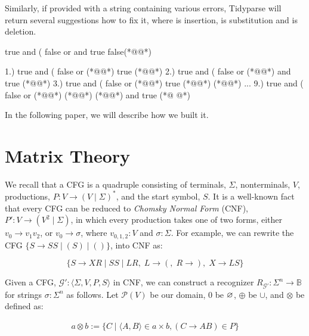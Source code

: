 \documentclass[sigplan,review,anonymous,acmsmall]{acmart}\settopmatter{printfolios=false,printccs=false,printacmref=false}
\begin{document}
    \noindent Similarly, if provided with a string containing various errors, Tidyparse will return several suggestions how to fix it, where  is insertion,  is substitution and  is deletion.

\begin{tidyinput}
true and ( false or and true false(*@\caret{ }@*)
\end{tidyinput}

\begin{tidyoutput}
1.) true and ( false or (*@\hlorange{!}@*) true (*@\hlorange{)}@*)
2.) true and ( false or (*@@*) and true (*@\hlorange{)}@*)
3.) true and ( false or (*@\hlorange{(}@*) true (*@\hlorange{)}@*) (*@\hlgreen{)}@*)
...
9.) true and ( false or (*@\hlgreen{!}@*) (*@@*) (*@\hlgreen{)}@*) and true (*@ @*)
\end{tidyoutput}

    \noindent In the following paper, we will describe how we built it.

    \section{Matrix Theory}

    We recall that a CFG is a quadruple consisting of terminals, $\Sigma$, nonterminals, $V$, productions, $P: V \rightarrow (V \mid \Sigma)^*$, and the start symbol, $S$. It is a well-known fact that every CFG can be reduced to \textit{Chomsky Normal Form} (CNF), $P': V \rightarrow (V^2 \mid \Sigma)$, in which every production takes one of two forms, either $v_0 \rightarrow v_1 v_2$, or $v_0 \rightarrow \sigma$, where $v_{0, 1, 2}: V$ and $\sigma: \Sigma$. For example, we can rewrite the CFG $\{S \rightarrow S S \mid ( S ) \mid ()\}$, into CNF as:

    \[
        \{S\rightarrow XR \mid SS \mid LR,\; L \rightarrow (,\; R \rightarrow ),\; X\rightarrow LS\}
    \]

    \noindent Given a CFG, $\mathcal{G}' : \langle \Sigma, V, P, S\rangle$ in CNF, we can construct a recognizer $R_{\mathcal{G}'}: \Sigma^n \rightarrow \mathbb{B}$ for strings $\sigma: \Sigma^n$ as follows. Let $\mathcal P(V)$ be our domain, $0$ be $\varnothing$, $\oplus$ be $\cup$, and $\otimes$ be defined as:

    \begin{align}
        a \otimes b := \{C \mid \langle A, B\rangle \in a \times b, (C\rightarrow AB) \in P\}
    \end{align}
\end{document}
